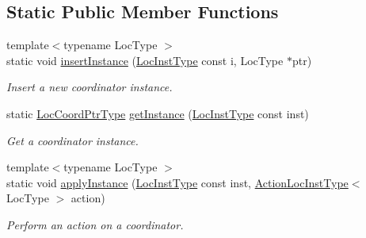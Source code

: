 \subsection*{Static Public Member Functions}
\begin{DoxyCompactItemize}
\item 
{\footnotesize template$<$typename Loc\+Type $>$ }\\static void \hyperlink{structvt_1_1location_1_1_location_manager_a61767ba0d9bd9029686c136cdb8eaece}{insert\+Instance} (\hyperlink{namespacevt_1_1location_a4db6456e8024af2d23fc5ae560fef866}{Loc\+Inst\+Type} const i, Loc\+Type $\ast$ptr)
\begin{DoxyCompactList}\small\item\em Insert a new coordinator instance. \end{DoxyCompactList}\item 
static \hyperlink{structvt_1_1location_1_1_location_manager_a98ed824c058080e538546fc731cb8f4c}{Loc\+Coord\+Ptr\+Type} \hyperlink{structvt_1_1location_1_1_location_manager_a1533939b198e3d7a2d5298995b87ab21}{get\+Instance} (\hyperlink{namespacevt_1_1location_a4db6456e8024af2d23fc5ae560fef866}{Loc\+Inst\+Type} const inst)
\begin{DoxyCompactList}\small\item\em Get a coordinator instance. \end{DoxyCompactList}\item 
{\footnotesize template$<$typename Loc\+Type $>$ }\\static void \hyperlink{structvt_1_1location_1_1_location_manager_ae87fb969a0c0e2a45ca3ff15a0f01c00}{apply\+Instance} (\hyperlink{namespacevt_1_1location_a4db6456e8024af2d23fc5ae560fef866}{Loc\+Inst\+Type} const inst, \hyperlink{structvt_1_1location_1_1_location_manager_a6de3841092c537efc5fb8376128bfe18}{Action\+Loc\+Inst\+Type}$<$ Loc\+Type $>$ action)
\begin{DoxyCompactList}\small\item\em Perform an action on a coordinator. \end{DoxyCompactList}\end{DoxyCompactItemize}
